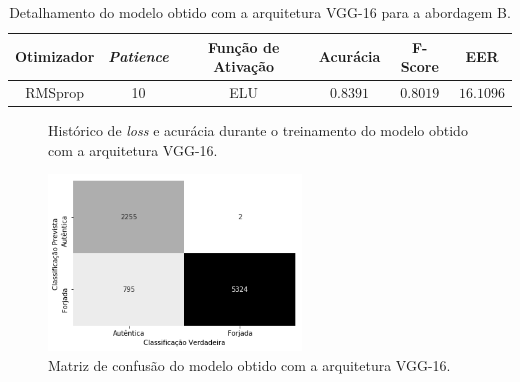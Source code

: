 \begin{table}[h!]
\centering
\caption{Detalhamento do modelo obtido com a arquitetura VGG-16 para a abordagem B.}
\label{tab:shufflenet}
\begin{tabular}{cccccc}
\toprule
\textbf{Otimizador} & \textbf{\emph{Patience}}  & \textbf{Função de Ativação} & \textbf{Acurácia} & \textbf{F-Score} & \textbf{EER} \\
\midrule
RMSprop & 10 & ELU & $0.8391$ & $0.8019$ & $16.1096$ \\
\bottomrule
\end{tabular}
\end{table}

\begin{figure}[H]
\centering
\caption{Histórico de \emph{loss} e acurácia durante o treinamento do modelo obtido com a arquitetura VGG-16.}
\label{fig:treinamento-vgg}
\hfill
{}
\end{figure}

\begin{figure}[h]
    \centering
    \caption{Matriz de confusão do modelo obtido com a arquitetura VGG-16.}\label{fig:matrizes-vgg}
    \includegraphics[width=0.6\textwidth]{imgs/matriz-squeezenet-a}
\end{figure}
